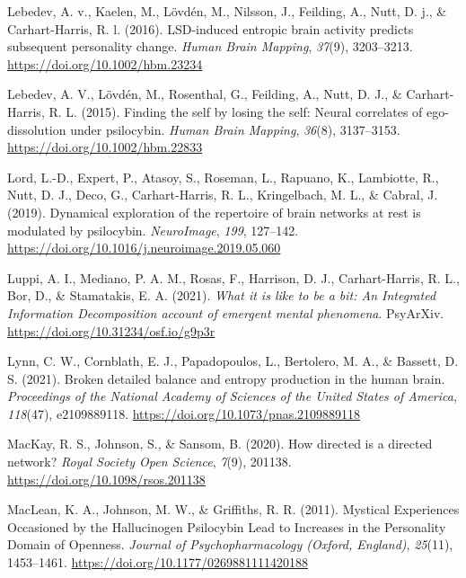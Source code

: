\begin{CSLReferences}{1}{0}
Lebedev, A. v., Kaelen, M., Lövdén, M., Nilsson, J., Feilding, A., Nutt,
D. j., \& Carhart-Harris, R. l. (2016). LSD-induced entropic brain
activity predicts subsequent personality change. \emph{Human Brain
Mapping}, \emph{37}(9), 3203--3213.
\url{https://doi.org/10.1002/hbm.23234}

Lebedev, A. V., Lövdén, M., Rosenthal, G., Feilding, A., Nutt, D. J., \&
Carhart-Harris, R. L. (2015). Finding the self by losing the self:
Neural correlates of ego-dissolution under psilocybin. \emph{Human Brain
Mapping}, \emph{36}(8), 3137--3153.
\url{https://doi.org/10.1002/hbm.22833}

Lord, L.-D., Expert, P., Atasoy, S., Roseman, L., Rapuano, K.,
Lambiotte, R., Nutt, D. J., Deco, G., Carhart-Harris, R. L.,
Kringelbach, M. L., \& Cabral, J. (2019). Dynamical exploration of the
repertoire of brain networks at rest is modulated by psilocybin.
\emph{NeuroImage}, \emph{199}, 127--142.
\url{https://doi.org/10.1016/j.neuroimage.2019.05.060}

Luppi, A. I., Mediano, P. A. M., Rosas, F., Harrison, D. J.,
Carhart-Harris, R. L., Bor, D., \& Stamatakis, E. A. (2021). \emph{What
it is like to be a bit: An Integrated Information Decomposition account
of emergent mental phenomena}. PsyArXiv.
\url{https://doi.org/10.31234/osf.io/g9p3r}

Lynn, C. W., Cornblath, E. J., Papadopoulos, L., Bertolero, M. A., \&
Bassett, D. S. (2021). Broken detailed balance and entropy production in
the human brain. \emph{Proceedings of the National Academy of Sciences
of the United States of America}, \emph{118}(47), e2109889118.
\url{https://doi.org/10.1073/pnas.2109889118}

MacKay, R. S., Johnson, S., \& Sansom, B. (2020). How directed is a
directed network? \emph{Royal Society Open Science}, \emph{7}(9),
201138. \url{https://doi.org/10.1098/rsos.201138}

MacLean, K. A., Johnson, M. W., \& Griffiths, R. R. (2011). Mystical
Experiences Occasioned by the Hallucinogen Psilocybin Lead to Increases
in the Personality Domain of Openness. \emph{Journal of
Psychopharmacology (Oxford, England)}, \emph{25}(11), 1453--1461.
\url{https://doi.org/10.1177/0269881111420188}


\end{CSLReferences}
